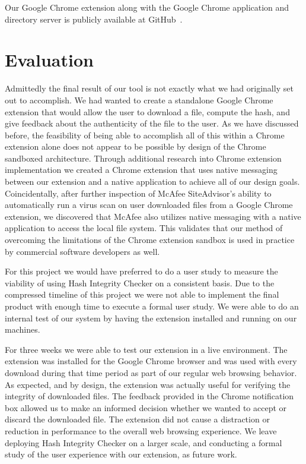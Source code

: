 \documentclass[letterpaper,twocolumn,10pt]{article}
\begin{document}
Our Google Chrome extension along with the Google Chrome application and directory server is publicly available at GitHub~\cite{hic}.

\section{Evaluation}
Admittedly the final result of our tool is not exactly what we had originally set out to accomplish. We had wanted to create a standalone Google Chrome extension that would allow the user to download a file, compute the hash, and give feedback about the authenticity of the file to the user. As we have discussed before, the feasibility of being able to accomplish all of this within a Chrome extension alone does not appear to be possible by design of the Chrome sandboxed architecture. Through additional research into Chrome extension implementation we created a Chrome extension that uses native messaging between our extension and a native application to achieve all of our design goals. Coincidentally, after further inspection of McAfee SiteAdvisor's ability to automatically run a virus scan on user downloaded files from a Google Chrome extension, we discovered that McAfee also utilizes native messaging with a native application to access the local file system. This validates that our method of overcoming the limitations of the Chrome extension sandbox is used in practice by commercial software developers as well.

For this project we would have preferred to do a user study to measure the viability of using Hash Integrity Checker on a consistent basis. Due to the compressed timeline of this project we were not able to implement the final product with enough time to execute a formal user study. We were able to do an internal test of our system by having the extension installed and running on our machines.

For three weeks we were able to test our extension in a live environment. The extension was installed for the Google Chrome browser and was used with every download during that time period as part of our regular web browsing behavior. As expected, and by design, the extension was actually useful for verifying the integrity of downloaded files. The feedback provided in the Chrome notification box allowed us to make an informed decision whether we wanted to accept or discard the downloaded file. The extension did not cause a distraction or reduction in performance to the overall web browsing experience. We leave deploying Hash Integrity Checker on a larger scale, and conducting a formal study of the user experience with our extension, as future work.
\end{document}
